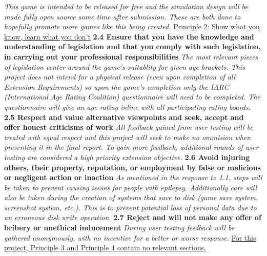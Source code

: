 \documentclass{report}
\begin{document}
\begin{raggedright}
\newline
\newline
\textit{This game is intended to be released for free and the simulation design will be made fully open source some time after submission. These are both done to hopefully promote more games like this being created.}
\newline
\newline
{\Large \underline{Principle 2: Show what you know, learn what you don't}}
\newline
\newline
\textbf{2.4 Ensure that you have the knowledge and understanding of legislation and that you comply with such legislation, in carrying out your professional responsibilities}
\newline
\newline
\textit{The most relevant pieces of legislation center around the game's suitablity for given age brackets. This project does not intend for a physical release (even upon completion of all Extension Requirements) so upon the game's completion only the IARC (International Age Rating Coalition) questionnaire will need to be completed. The questionnaire will give an age rating inline with all participating rating boards.}
\newline
\newline
\textbf{2.5 Respect and value alternative viewpoints and seek, accept and offer honest criticisms of work}
\newline
\newline
\textit{All feedback gained from user testing will be treated with equal respect and this project will seek to make no ommision when presenting it in the final report. To gain more feedback, additional rounds of user testing are considered a high priority extension objective.}
\newline
\newline
\textbf{2.6 Avoid injuring others, their property, reputation, or employment by false or malicious or negligent action or inaction}
\newline
\newline
\textit{As mentioned in the response to 1.1, steps will be taken to prevent causing issues for people with epilepsy. Additionally care will also be taken during the creation of systems that save to disk (game save system, screenshot system, etc.). This is to prevent potential loss of personal data due to an erroneous disk write operation.}
\newline
\newline
\textbf{2.7 Reject and will not make any offer of bribery or unethical inducement}
\newline
\newline
\textit{During user testing feedback will be gathered anonymously, with no incentive for a better or worse response.}
\newline
\newline
\underline{For this project, Principle 3 and Principle 4 contain no relevant sections.}
\end{raggedright}
\end{document}
